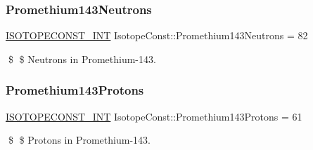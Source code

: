 \subsubsection{\texorpdfstring{Promethium143\+Neutrons}{Promethium143Neutrons}}
{\footnotesize\ttfamily \mbox{\hyperlink{group___isotope_const-_macros_ga5f18360b3e99483a35c32d789e62621c}{I\+S\+O\+T\+O\+P\+E\+C\+O\+N\+S\+T\+\_\+\+I\+NT}} Isotope\+Const\+::\+Promethium143\+Neutrons = 82}

\$ \$ Neutrons in Promethium-\/143. \mbox{\label{group___isotope_const-_promethium-_pm143_ga49a61bb77ef2f5d0c76c5df9083b4a56}} 
\subsubsection{\texorpdfstring{Promethium143\+Protons}{Promethium143Protons}}
{\footnotesize\ttfamily \mbox{\hyperlink{group___isotope_const-_macros_ga5f18360b3e99483a35c32d789e62621c}{I\+S\+O\+T\+O\+P\+E\+C\+O\+N\+S\+T\+\_\+\+I\+NT}} Isotope\+Const\+::\+Promethium143\+Protons = 61}

\$ \$ Protons in Promethium-\/143. 